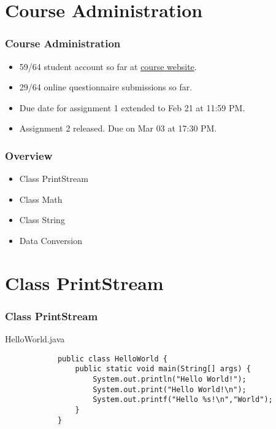 \documentclass[10pt, compress]{beamer}
\begin{document}
\prepareCover

\section{Course Administration}

\begin{frame}[fragile]
\frametitle{Course Administration}
	\begin{itemize}
		\item[] 59/64 student account so far at \href{http://ghorbanzade.com/}{course website}.
		\item[] 29/64 online questionnaire submissions so far.
		\item[] Due date for assignment 1 extended to Feb 21 at 11:59 PM.
		\item[] Assignment 2 released. Due on Mar 03 at 17:30 PM.
	\end{itemize}
\end{frame}

\begin{frame}[fragile]
	\frametitle{Overview}
	\begin{itemize}
		\item[] Class PrintStream
		\item[] Class Math
		\item[] Class String
		\item[] Data Conversion
	\end{itemize}
\end{frame}

\section{Class PrintStream}

\begin{frame}[fragile]
	\frametitle{Class PrintStream}
	\begin{block}{HelloWorld.java}
		\begin{verbatim}
			public class HelloWorld {
			    public static void main(String[] args) {
			        System.out.println("Hello World!");
			        System.out.print("Hello World!\n");
			        System.out.printf("Hello %s!\n","World");
			    }
			}
		\end{verbatim}
	\end{block}
\end{frame}
\end{document}
